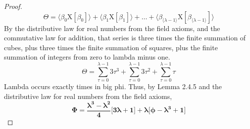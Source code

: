 \documentclass[a4paper, 12pt]{article}
\theoremstyle{plain}
\begin{document}
\begin{proof}
    \begin{equation*}
        \Theta
            =
        \Big \langle \beta_0 \mathrm{X} [\beta_0] \Big \rangle
            +
        \Big \langle \beta_1 \mathrm{X} [\beta_1] \Big \rangle
            + 
        \dots 
            +
        \Big \langle 
            \beta_{\langle \lambda - 1 \rangle}
            \mathrm{X} [\beta_{\langle \lambda - 1 \rangle}]
        \Big \rangle
    \end{equation*}
    By the distributive law for real numbers from the field axioms,
    and the commutative law for addition, that series is
    three times the finite summation of cubes,
    plus three times the finite summation of squares,
    plus the finite summation of integers from zero to lambda minus one.
    \begin{equation*}
        \Theta 
            = 
        \sum_{\tau=0}^{\lambda - 1} 3 \tau ^3
            +
        \sum_{\tau=0}^{\lambda - 1} 3 \tau ^2
            +
        \sum_{\tau=0}^{\lambda - 1} \tau
    \end{equation*}
    Lambda occurs exactly  
    times in big phi. 
    Thus, by Lemma 2.4.5
    and the distributive law for real numbers from the field axioms,
    \begin{equation*}
        \bm{
            \Phi
                =
            \frac{
                \lambda ^3 - \lambda ^2
            }
            {4}
            \Bigg[ 3 \lambda + 1 \Bigg]
                + 
            \lambda
            \Bigg[
                \phi - \lambda ^3 + 1
            \Bigg]
        }
    \end{equation*}
\color{lightgray} \end{proof}
\pagebreak
\end{document}
